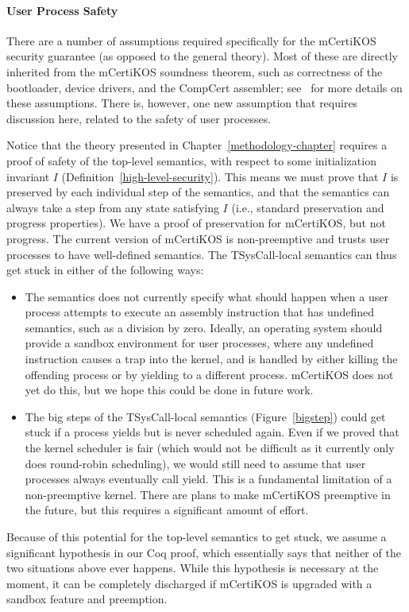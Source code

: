 \paragraph{User Process Safety}
There are a number of assumptions required specifically for the mCertiKOS
security guarantee (as opposed to the general theory). Most of these are 
directly inherited from the mCertiKOS
soundness theorem, such as correctness of the bootloader, device drivers,
and the CompCert assembler; see~\cite{certikos-popl} for more details on
these assumptions. There is, however, one new assumption that requires 
discussion here, related to the safety of user processes.

Notice that the theory presented in Chapter~\ref{methodology-chapter} 
requires a proof of safety of the 
top-level semantics, with respect to some initialization invariant $I$ 
(Definition~\ref{high-level-security}). This means 
we must prove that $I$ is preserved by each individual step of the 
semantics, and that the semantics can always take a step from any state
satisfying $I$ (i.e., standard preservation and progress properties).
We have a proof of preservation for mCertiKOS, but not progress.
The current version of mCertiKOS is non-preemptive 
and trusts user processes to have well-defined semantics. The TSysCall-local
semantics can thus get stuck in either of the following ways:
\begin{itemize}
\item The semantics does not currently specify what should happen when a 
user process attempts to execute an assembly instruction that has 
undefined semantics, such as a division by zero. Ideally, an operating system 
should provide a sandbox environment for user processes, where any undefined 
instruction causes a trap into the kernel, and is handled by either killing the
offending process or by yielding to a different process. mCertiKOS does not yet 
do this, but we hope this could be done in future work.
\item The big steps of the TSysCall-local semantics (Figure~\ref{bigstep}) could 
get stuck if a process yields but is never scheduled again. Even if we proved 
that the kernel scheduler is fair (which would not be difficult as it currently 
only does round-robin scheduling), we would still need to assume that user 
processes always eventually call yield. This is a fundamental limitation of a 
non-preemptive kernel. There are plans to make mCertiKOS preemptive in the 
future, but this requires a significant amount of effort.
\end{itemize}
Because of this potential for the top-level semantics to get stuck, we assume 
a significant hypothesis in our Coq proof, which essentially says that neither of
the two situations above ever happens. While this hypothesis is necessary
at the moment, it can be completely discharged if mCertiKOS is upgraded 
with a sandbox feature and preemption.

